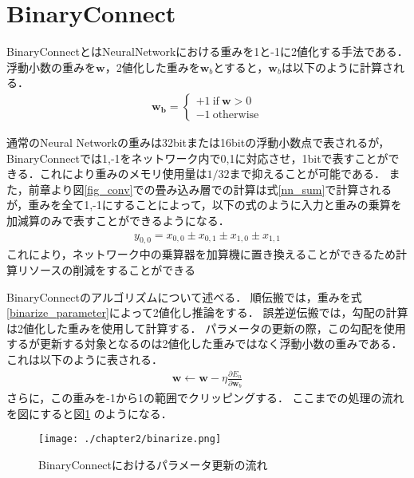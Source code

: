 \section{BinaryConnect}
BinaryConnectとはNeuralNetworkにおける重みを1と-1に2値化する手法である．浮動小数の重みを$\bm{w}$，2値化した重みを$\bm{w}_b$とすると，$\bm{w}_b$は以下のように計算される\cite{courbariaux2016binaryconnect}．
\begin{eqnarray}
  \bm{w_{b}} = \left\{ \begin{array}{l}
  \displaystyle 
  +1\:  \text{if}\:  \bm{w} > 0 \\
  -1\:\text{otherwise}
  \end{array} \right.
  \label{binarize_parameter}
\end{eqnarray}

通常のNeural Networkの重みは32bitまたは16bitの浮動小数点で表されるが，BinaryConnectでは1,-1をネットワーク内で0,1に対応させ，1bitで表すことができる．これにより重みのメモリ使用量は$1/32$まで抑えることが可能である．
また，前章より図\ref{fig_conv}での畳み込み層での計算は式\ref{nn_sum}で計算されるが，重みを全て1,-1にすることによって，以下の式のように入力と重みの乗算を加減算のみで表すことができるようになる．
\begin{align}
  y_{0,0} = x_{0,0} \pm x_{0,1} \pm x_{1,0} \pm x_{1,1}
\end{align}
これにより，ネットワーク中の乗算器を加算機に置き換えることができるため計算リソースの削減をすることができる

BinaryConnectのアルゴリズムについて述べる．
順伝搬では，重みを式\ref{binarize_parameter}によって2値化し推論をする．
誤差逆伝搬では，勾配の計算は2値化した重みを使用して計算する．
パラメータの更新の際，この勾配を使用するが更新する対象となるのは2値化した重みではなく浮動小数の重みである．これは以下のように表される．
\begin{align}
  \bm{w} \gets \bm{w} - \eta \frac{\partial E_n}{\partial \bm{w}_{b}}
\end{align}
さらに，この重みを-1から1の範囲でクリッピングする．
ここまでの処理の流れを図にすると図\ref{fig_binarize} のようになる．
\begin{figure}[htbp]
  \begin{center}
    \texttt{[image: ./chapter2/binarize.png]}
    \caption{BinaryConnectにおけるパラメータ更新の流れ}
    \label{fig_binarize}
  \end{center}
\end{figure}
